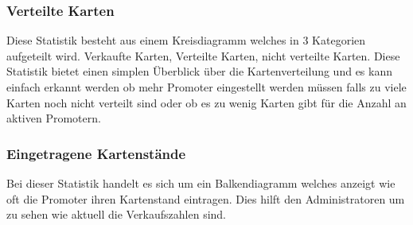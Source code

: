 			\subsubsection{Verteilte Karten}
				Diese Statistik besteht aus einem Kreisdiagramm welches in 3 Kategorien aufgeteilt wird. Verkaufte Karten, Verteilte Karten, nicht verteilte Karten. Diese Statistik bietet einen simplen Überblick über die Kartenverteilung und es kann einfach erkannt werden ob mehr Promoter eingestellt werden müssen falls zu viele Karten noch nicht verteilt sind oder ob es zu wenig Karten gibt für die Anzahl an aktiven Promotern. 
				
			\subsubsection{Eingetragene Kartenstände}
				Bei dieser Statistik handelt es sich um ein Balkendiagramm welches anzeigt wie oft die Promoter ihren Kartenstand eintragen. Dies hilft den Administratoren um zu sehen wie aktuell die Verkaufszahlen sind.
				
			\subsubsection{}
